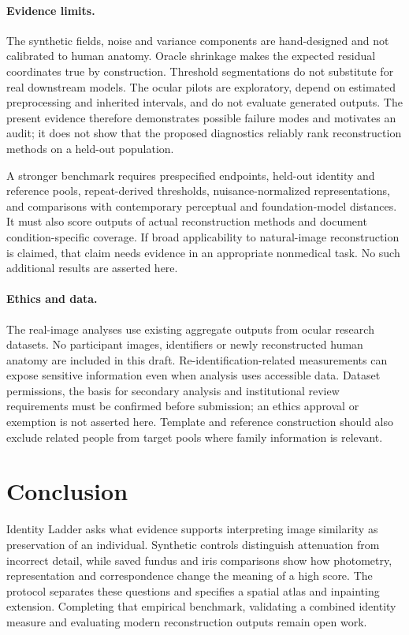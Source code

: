 \documentclass[10pt,twocolumn,letterpaper]{article}
\begin{document}
\paragraph{Evidence limits.}
The synthetic fields, noise and variance components are hand-designed and not calibrated to human anatomy. Oracle shrinkage makes the expected residual coordinates true by construction. Threshold segmentations do not substitute for real downstream models. The ocular pilots are exploratory, depend on estimated preprocessing and inherited intervals, and do not evaluate generated outputs. The present evidence therefore demonstrates possible failure modes and motivates an audit; it does not show that the proposed diagnostics reliably rank reconstruction methods on a held-out population.

A stronger benchmark requires prespecified endpoints, held-out identity and reference pools, repeat-derived thresholds, nuisance-normalized representations, and comparisons with contemporary perceptual and foundation-model distances. It must also score outputs of actual reconstruction methods and document condition-specific coverage. If broad applicability to natural-image reconstruction is claimed, that claim needs evidence in an appropriate nonmedical task. No such additional results are asserted here.

\paragraph{Ethics and data.}
The real-image analyses use existing aggregate outputs from ocular research datasets. No participant images, identifiers or newly reconstructed human anatomy are included in this draft. Re-identification-related measurements can expose sensitive information even when analysis uses accessible data. Dataset permissions, the basis for secondary analysis and institutional review requirements must be confirmed before submission; an ethics approval or exemption is not asserted here. Template and reference construction should also exclude related people from target pools where family information is relevant.

\section{Conclusion}
Identity Ladder asks what evidence supports interpreting image similarity as preservation of an individual. Synthetic controls distinguish attenuation from incorrect detail, while saved fundus and iris comparisons show how photometry, representation and correspondence change the meaning of a high score. The protocol separates these questions and specifies a spatial atlas and inpainting extension. Completing that empirical benchmark, validating a combined identity measure and evaluating modern reconstruction outputs remain open work.
\end{document}
